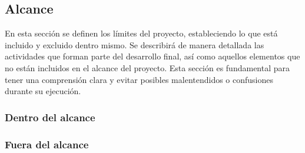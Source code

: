 \subsection{Alcance}
En esta sección se definen los límites del proyecto, estableciendo lo que está
incluido y excluido dentro mismo. Se describirá de manera detallada las
actividades que forman parte del desarrollo final, así como aquellos elementos
que no están incluidos en el alcance del proyecto. Esta sección es fundamental
para tener una comprensión clara y evitar posibles malentendidos o confusiones
durante su ejecución.

\subsubsection{Dentro del alcance}
\subsubsection{Fuera del alcance}

\pagebreak